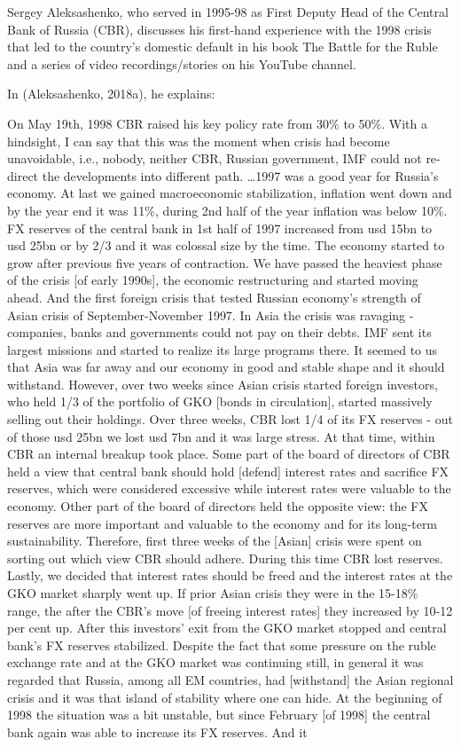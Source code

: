 Sergey Aleksashenko, who served in 1995-98 as First Deputy Head of the Central Bank of Russia (CBR), discusses his first-hand experience with the 1998 crisis that led to the country's domestic default in his book The Battle for the Ruble and a series of video recordings/stories on his YouTube channel. 

In (Aleksashenko, 2018a), he explains:

On May 19th, 1998 CBR raised his key policy rate from 30\% to 50\%. With a hindsight, I can say that this was the moment when crisis had become unavoidable, i.e., nobody, neither CBR, Russian government, IMF could not re-direct the developments into different path. \dots 1997 was a good year for Russia's economy. At last we gained macroeconomic stabilization, inflation went down and by the year end it was 11\%, during 2nd half of the year inflation was below 10\%. FX reserves of the central bank in 1st half of 1997 increased from \ac{usd} 15bn to \ac{usd} 25bn or by 2/3 and it was colossal size by the time. The economy started to grow after previous five years of contraction. We have passed the heaviest phase of the crisis [of early 1990s], the economic restructuring and started moving ahead. And the first foreign crisis that tested Russian economy's strength of Asian crisis of September-November 1997. In Asia the crisis was ravaging - companies, banks and governments could not pay on their debts. IMF sent its largest missions and started to realize its large programs there. It seemed to us that Asia was far away and our economy in good and stable shape and it should withstand. However, over two weeks since Asian crisis started foreign investors, who held 1/3 of the portfolio of GKO [bonds in circulation], started massively selling out their holdings. Over three weeks, CBR lost 1/4 of its FX reserves - out of those \ac{usd} 25bn we lost \ac{usd} 7bn and it was large stress. At that time, within CBR an internal breakup took place. Some part of the board of directors of CBR held a view that central bank should hold [defend] interest rates and sacrifice FX reserves, which were considered excessive while interest rates were valuable to the economy. Other part of the board of directors held the opposite view: the FX reserves are more important and valuable to the economy and for its long-term sustainability. Therefore, first three weeks of the [Asian] crisis were spent on sorting out which view CBR should adhere. During this time CBR lost reserves. Lastly, we decided that interest rates should be freed and the interest rates at the GKO market sharply went up. If prior Asian crisis they were in the 15-18\% range, the after the CBR's move [of freeing interest rates] they increased by 10-12 per cent up. After this investors' exit from the GKO market stopped and central bank's FX reserves stabilized. Despite the fact that some pressure on the ruble exchange rate and at the GKO market was continuing still, in general it was regarded that Russia, among all EM countries, had [withstand] the Asian regional crisis and it was that island of stability where one can hide. At the beginning of 1998 the situation was a bit unstable, but since February [of 1998] the central bank again was able to increase its FX reserves. And it 